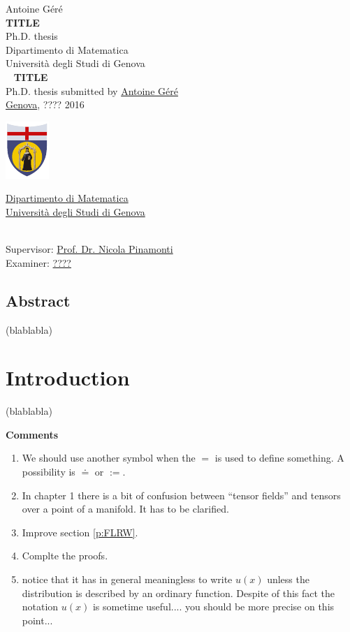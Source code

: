\documentclass[11pt]{book}
\makeatletter
\newcommand*{\makepagetitle}{%
%
{\raggedright%
%
%
%
%
\thispagestyle{empty}%
%
\vspace*{50pt}
%
{\Large Antoine Géré}\\%
%
\vspace*{120pt}%
%
{\Huge\bfseries TITLE}\\[\baselineskip]%
%
\vspace*{60pt}%
%
{\Large Ph.D. thesis}\\[\baselineskip]%
%
\vspace*{80pt}%
%
{\Large Dipartimento di Matematica}\\[\baselineskip]%
%
\vspace*{1pt}
%
{\Large Università degli Studi di Genova}\\[\baselineskip]%
%
\vfill%
%
%
\newpage%
%
\thispagestyle{empty}%
%
\ \vfill%
%
%
\textbf{TITLE} \\[2pt] %
Ph.D. thesis submitted by \href{mailto:gere@dima.unige.it}{Antoine Géré} \\[1pt]
\href{http://www.comune.genova.it/}{Genova}, ???? 2016 \\[10pt]
%
%
\begin{minipage}{0.1\linewidth}
\includegraphics[scale=1]{unige.pdf}
\end{minipage}
%
\begin{minipage}{0.85\linewidth}
\href{http://www.dima.unige.it/}{Dipartimento di Matematica} \\[1pt]
\href{http://www.unige.it/}{Università degli Studi di Genova}
\end{minipage}
%
%
\vspace*{10pt} \\
Supervisor: \href{mailto:pinamont@dima.unige.it}{Prof. Dr. Nicola Pinamonti} \\[1pt]
%
Examiner: \href{mailto:????@????.com}{????}
%
%
%
%
}%
%
}%
\theoremstyle{break}
\makeatother
\begin{document}




\makepagetitle




\newpage


\vspace*{100pt}


\section*{Abstract}




(blablabla)




\tableofcontents




\chapter*{Introduction}






(blablabla)


\vspace*{50pt}
\noindent
\textbf{Comments}


\begin{enumerate}


\item We should use another symbol when the $=$ is used to define something. A possibility is $\doteq$ or $:=$.


\item In chapter 1 there is a bit of confusion between ``tensor fields'' and tensors over a point of a manifold. It has to be clarified.


\item Improve section \ref{p:FLRW}.


\item Complte the proofs.


\item notice that it has in general meaningless to write $u(x)$ unless the distribution is described by an ordinary function. Despite of this fact the notation $u(x)$ is sometime useful.... you should be more precise on this point...


\end{enumerate}
\end{document}
